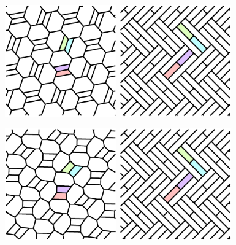 \documentclass{beamer}
\begin{document}
\begin{frame}
  \begin{center}
    \includegraphics[width=1.9in]{c07}
    \includegraphics[width=1.9in]{c12}
  \end{center}
\end{frame}

\begin{frame}
  \begin{center}
    \includegraphics[width=1.9in]{c08}
    \includegraphics[width=1.9in]{c12}
  \end{center}
\end{frame}
\end{document}
